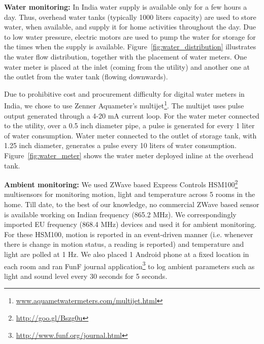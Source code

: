\documentclass[10pt]{sensys-proc}
\newcommand{\figref}[1]{Figure~\ref{#1}}
\begin{document}
\noindent \textbf{Water monitoring:} 
In India water supply is available only for a few hours a day. Thus, overhead water tanks (typically 1000 liters capacity) are used to store water, when available, and supply it for home activities throughout the day. Due to low water pressure, electric motors are used to pump the water for storage for the times when the supply is available. %
\figref{fig:water_distribution} illustrates the water flow distribution, together with the placement of water meters. One water meter is placed at the inlet (coming from the utility) and another one at the outlet from the water tank (flowing downwards). %

Due to prohibitive cost and procurement difficulty for digital water meters in India, we chose to use Zenner Aquameter's multijet\footnote{\url{www.aquametwatermeters.com/multijet.html}}. The multijet uses pulse output generated through a 4-20 mA current loop. 
For the water meter connected to the utility, over a 0.5 inch diameter pipe, a pulse is generated for every 1 liter of water consumption. Water meter connected to the outlet of storage tank, with 1.25 inch diameter, generates a pulse every 10 liters of water consumption. %
\figref{fig:water_meter} shows the water meter deployed inline at the overhead tank.

\noindent \textbf{Ambient monitoring:} We used ZWave based Express Controls HSM100\footnote{\url{http://goo.gl/Bszg0u}} multisensors for monitoring motion, light and temperature across 5 rooms in the home. Till date, to the best of our knowledge, no commercial ZWave based sensor is available working on Indian frequency (865.2 MHz). We correspondingly imported EU frequency (868.4 MHz) devices and used it for ambient monitoring. For these HSM100, motion is reported in an event-driven manner (i.e. whenever there is change in motion status, a reading is reported) and temperature and light are polled at 1 Hz. We also placed 1 Android phone at a fixed location in each room and ran FunF journal application\footnote{\url{http://www.funf.org/journal.html}} to log ambient parameters such as light and sound level every 30 seconds for 5 seconds.
\end{document}
